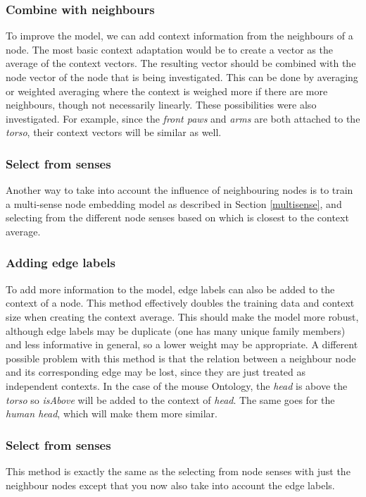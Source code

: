 \documentclass{article}
\begin{document}
  \subsubsection{Combine with neighbours}
  To improve the model, we can add context information from the neighbours of a node. The most basic context adaptation would be to create a vector as the average of the context vectors. The resulting vector should be combined with the node vector of the node that is being investigated. This can be done by averaging or weighted averaging where the context is weighed more if there are more neighbours, though not necessarily linearly. These possibilities were also investigated.
  For example, since the \emph{front paws} and \emph{arms} are both attached to the \emph{torso}, their context vectors will be similar as well.
  \subsubsection{Select from senses}
  Another way to take into account the influence of neighbouring nodes is to train a multi-sense node embedding model as described in Section \ref{multisense}, and selecting from the different node senses based on which is closest to the context average.
  \subsubsection{Adding edge labels}
  To add more information to the model, edge labels can also be added to the context of a node. This method effectively doubles the training data and context size when creating the context average. This should make the model more robust, although edge labels may be duplicate (one has many unique family members) and less informative in general, so a lower weight may be appropriate. A different possible problem with this method is that the relation between a neighbour node and its corresponding edge may be lost, since they are just treated as independent contexts.
  In the case of the mouse Ontology, the \emph{head} is above the \emph{torso} so \emph{isAbove} will be added to the context of \emph{head}. The same goes for the \emph{human head}, which will make them more similar.
  \subsubsection{Select from senses}
  This method is exactly the same as the selecting from node senses with just the neighbour nodes except that you now also take into account the edge labels.
\end{document}
